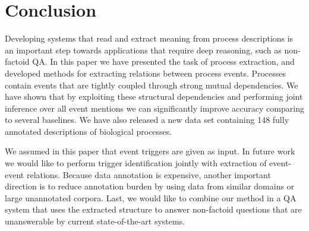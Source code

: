 \section{Conclusion}

Developing systems that read and extract meaning from process descriptions is an important step towards applications that require deep reasoning, such as non-factoid QA. In this paper we have presented the task of process extraction, and developed methods for extracting relations between process events. Processes contain events that are  tightly coupled through strong mutual dependencies. We have shown that by exploiting these structural dependencies and performing joint inference over all event mentions we can significantly improve accuracy comparing to several baselines. We have also released a new data set containing 148 fully annotated descriptions of biological processes.

We assumed in this paper that event triggers are given as input. In future work we would like to perform trigger identification jointly with extraction of event-event relations. Because data annotation is expensive, another important direction is to reduce annotation burden by using data from similar domains or large unannotated corpora. Last, we would like to combine our method in a QA system that uses the extracted structure to answer non-factoid questions that are unanswerable by current state-of-the-art systems.